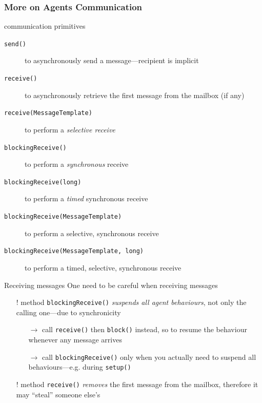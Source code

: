 \documentclass{beamer}\mode<presentation>{\usetheme{AMSCesenaPurpleAndGold}}
\begin{document}
\begin{frame}[c,allowframebreaks]\frametitle{More on Agents Communication}
    \begin{block}{\jade{} communication primitives}
        \begin{description}
            \item[\texttt{send()}] to \alert{asynchronously send} a message---recipient is implicit
            \item[\texttt{receive()}] to \alert{asynchronously retrieve} the first message from the mailbox (if any)
            \item[\texttt{receive(MessageTemplate)}] to perform a \emph{selective receive}
            \item[\texttt{blockingReceive()}] to perform a \emph{synchronous} receive
            \item[\texttt{blockingReceive(long)}] to perform a \emph{timed} synchronous receive
            \item[\texttt{blockingReceive(MessageTemplate)}] to perform a selective, synchronous receive
            \item[\texttt{blockingReceive(MessageTemplate, long)}] to perform a timed, selective, synchronous receive
        \end{description}
    \end{block}
    \begin{block}{Receiving messages}
        One need to be careful when receiving messages
        \begin{itemize}
            \item[!] method \texttt{blockingReceive()} \emph{suspends all agent behaviours}, not only the calling one---due to synchronicity
            \begin{itemize}
                \item[$\rightarrow$] call \texttt{receive()} then \texttt{block()} instead, so to resume the behaviour whenever any message arrives
                \item[$\rightarrow$] call \texttt{blockingReceive()} only when you actually need to suspend all behaviours---e.g. during \texttt{setup()}
            \end{itemize}
            \item[!] method \texttt{receive()} \emph{removes} the first message from the mailbox, therefore it may ``steal'' someone else's
            \begin{itemize}

\end{itemize}
\end{itemize}
\end{block}
\end{frame}
\end{document}
